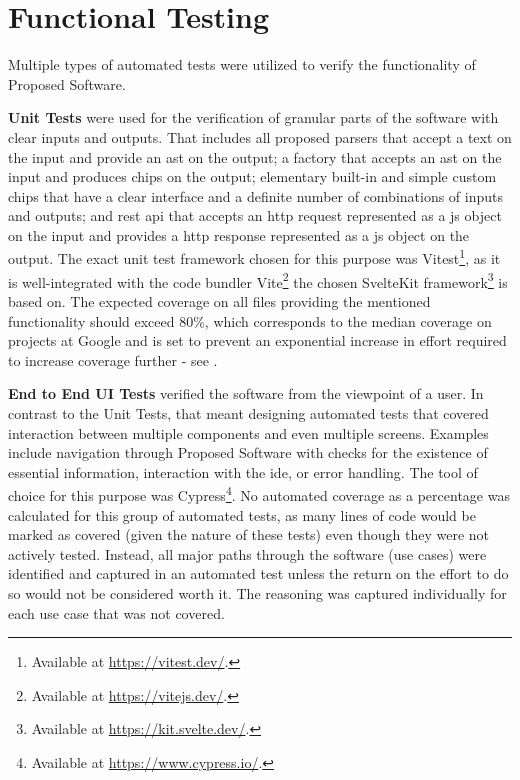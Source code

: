 
\section{Functional Testing}

Multiple types of automated tests were utilized to verify the functionality of Proposed Software.

\textbf{Unit Tests} were used for the verification of granular parts of the software with clear inputs and outputs.
That includes all proposed parsers that accept a text on the input and provide an \gls{ast} on the output; a factory that accepts an \gls{ast} on the input and produces chips on the output; elementary built-in and simple custom chips that have a clear interface and a definite number of combinations of inputs and outputs; and \gls{rest} \gls{api} that accepts an \gls{http} request represented as a \gls{js} object on the input and provides a \gls{http} response represented as a \gls{js} object on the output.
The exact unit test framework chosen for this purpose was Vitest\footnote{Available at \url{https://vitest.dev/}.}, as it is well-integrated with the code bundler Vite\footnote{Available at \url{https://vitejs.dev/}.} the chosen SvelteKit framework\footnote{Available at \url{https://kit.svelte.dev/}.} is based on.
The expected coverage on all files providing the mentioned functionality should exceed 80\%, which corresponds to the median coverage on projects at Google and is set to prevent an exponential increase in effort required to increase coverage further - see .

\textbf{End to End UI Tests} verified the software from the viewpoint of a user.
In contrast to the Unit Tests, that meant designing automated tests that covered interaction between multiple components and even multiple screens.
Examples include navigation through Proposed Software with checks for the existence of essential information, interaction with the \gls{ide}, or error handling.
The tool of choice for this purpose was Cypress\footnote{Available at \url{https://www.cypress.io/}.}.
No automated coverage as a percentage was calculated for this group of automated tests, as many lines of code would be marked as covered (given the nature of these tests) even though they were not actively tested.
Instead, all major paths through the software (use cases) were identified and captured in an automated test unless the return on the effort to do so would not be considered worth it.
The reasoning was captured individually for each use case that was not covered.

